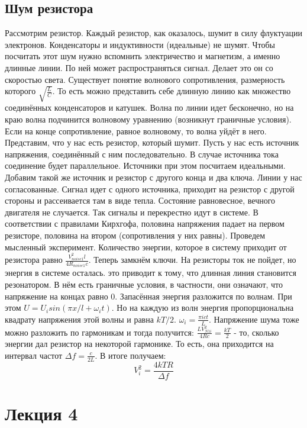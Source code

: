 \documentclass[a4paper, 12pt]{article}
\begin{document}
	\subsection{Шум резистора}
	Рассмотрим резистор. Каждый резистор, как оказалось, шумит в силу флуктуации электронов. Конденсаторы и индуктивности (идеальные) не шумят. Чтобы посчитать этот шум нужно вспомнить электричество и магнетизм, а именно длинные линии. По ней может распространяться сигнал. Делает это он со скоростью света. Существует понятие волнового сопротивления, размерность которого $\sqrt{\frac{L}{C}}$. То есть можно представить себе длинную линию как множество соединённых конденсаторов и катушек. Волна по линии идет бесконечно, но на краю волна подчинится волновому уравнению (возникнут граничные условия). Если на конце сопротивление, равное волновому, то волна уйдёт в него. Представим, что у нас есть резистор, который шумит. Пусть у нас есть источник напряжения, соединённый с ним последовательно. В случае источника тока соединение будет параллельное. Источники при этом посчитаем идеальными. Добавим такой же источник и резистор с другого конца и два ключа. Линии у нас согласованные. Сигнал идет с одного источника, приходит на резистор с другой стороны и рассеивается там в виде тепла. Состояние равновесное, вечного двигателя не случается. Так сигналы и перекрестно идут в системе. В соответствии с правилами Кирхгофа, половина напряжения падает на первом резисторе, половина на втором (сопротивления у них равны). Проведем мысленный эксперимент. Количество энергии, которое в систему приходит от резистора равно $\frac{V_{noise1}^2 l} {4R_{noise1} c }$. Теперь замкнём ключи. На резисторы ток не пойдет, но энергия в системе осталась. это приводит к тому, что длинная линия становится резонатором. В нём есть граничные условия, в частности, они означают, что напряжение на концах равно 0. Запасённая энергия разложится по волнам. При этом $U = U_{i} sin(\pi x/ l  + \omega_{i} t) $.  Но на каждую из волн энергия пропорциональна квадрату напряжения этой волны и равна $kT/2$. $\omega_i = \frac{\pi i c t}{L}$.  Напряжение шума тоже можно разложить по гармоникам и тогда получится: $\frac{LV_{N1i}^{2}}{4Rc}=\frac{kT}{2}$ - то, сколько энергии дал резистор на некоторой гармонике. То есть, она приходится на интервал частот $\Delta f= \frac{c}{2L}$. В итоге получаем:
	\begin{equation*}
		V_{i}^{2}=\frac{4kTR}{\Delta f}
	\end{equation*}
	\section{Лекция 4}
\end{document}
